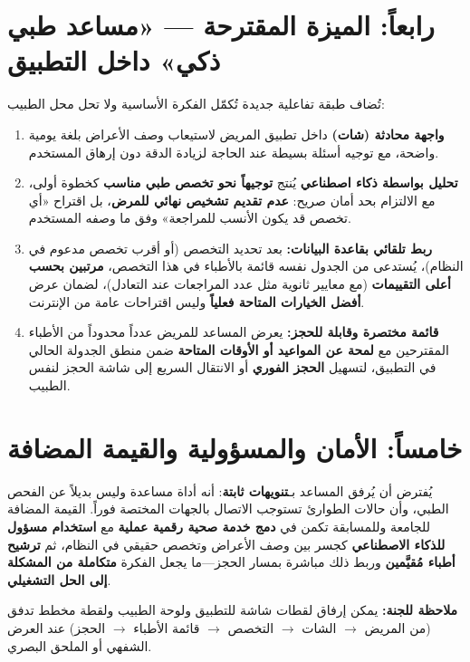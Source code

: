 \documentclass[12pt,a4paper]{article}
\begin{document}
\section*{رابعاً: الميزة المقترحة — «مساعد طبي ذكي» داخل التطبيق}
تُضاف طبقة تفاعلية جديدة تُكمّل الفكرة الأساسية ولا تحل محل الطبيب:

\begin{enumerate}
  \item \textbf{واجهة محادثة (شات)} داخل تطبيق المريض لاستيعاب وصف الأعراض بلغة يومية واضحة، مع توجيه أسئلة بسيطة عند الحاجة لزيادة الدقة دون إرهاق المستخدم.
  \item \textbf{تحليل بواسطة ذكاء اصطناعي} يُنتج \textbf{توجيهاً نحو تخصص طبي مناسب} كخطوة أولى، مع الالتزام بحد أمان صريح: \textbf{عدم تقديم تشخيص نهائي للمرض}، بل اقتراح «أي تخصص قد يكون الأنسب للمراجعة» وفق ما وصفه المستخدم.
  \item \textbf{ربط تلقائي بقاعدة البيانات:} بعد تحديد التخصص (أو أقرب تخصص مدعوم في النظام)، يُستدعى من الجدول نفسه قائمة بالأطباء في هذا التخصص، \textbf{مرتبين بحسب أعلى التقييمات} (مع معايير ثانوية مثل عدد المراجعات عند التعادل)، لضمان عرض \textbf{أفضل الخيارات المتاحة فعلياً} وليس اقتراحات عامة من الإنترنت.
  \item \textbf{قائمة مختصرة وقابلة للحجز:} يعرض المساعد للمريض عدداً محدوداً من الأطباء المقترحين مع \textbf{لمحة عن المواعيد أو الأوقات المتاحة} ضمن منطق الجدولة الحالي في التطبيق، لتسهيل \textbf{الحجز الفوري} أو الانتقال السريع إلى شاشة الحجز لنفس الطبيب.
\end{enumerate}

\section*{خامساً: الأمان والمسؤولية والقيمة المضافة}
يُفترض أن يُرفق المساعد بـ\textbf{تنويهات ثابتة}: أنه أداة مساعدة وليس بديلاً عن الفحص الطبي، وأن حالات الطوارئ تستوجب الاتصال بالجهات المختصة فوراً. القيمة المضافة للجامعة وللمسابقة تكمن في \textbf{دمج خدمة صحية رقمية عملية} مع \textbf{استخدام مسؤول للذكاء الاصطناعي} كجسر بين وصف الأعراض وتخصص حقيقي في النظام، ثم \textbf{ترشيح أطباء مُقيَّمين} وربط ذلك مباشرة بمسار الحجز—ما يجعل الفكرة \textbf{متكاملة من المشكلة إلى الحل التشغيلي}.

\vfill
\begin{center}\small
\textbf{ملاحظة للجنة:} يمكن إرفاق لقطات شاشة للتطبيق ولوحة الطبيب ولقطة مخطط تدفق (من المريض $\rightarrow$ الشات $\rightarrow$ التخصص $\rightarrow$ قائمة الأطباء $\rightarrow$ الحجز) عند العرض الشفهي أو الملحق البصري.
\end{center}
\end{document}
